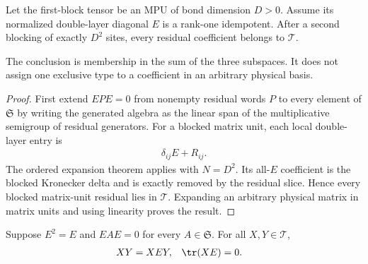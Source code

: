 \begin{lemma}
    \label{thm:mpu_second_block_residual_three_forms}
    \leanok
    Let the first-block tensor be an MPU of bond dimension $D>0$.  Assume its
    normalized double-layer diagonal $E$ is a rank-one idempotent.  After a
    second blocking of exactly $D^2$ sites, every residual coefficient belongs
    to $\mathcal T$.

    The conclusion is membership in the sum of the three subspaces.  It does
    not assign one exclusive type to a coefficient in an arbitrary physical
    basis.
\end{lemma}

\begin{proof}\leanok
    First extend $EPE=0$ from nonempty residual words $P$ to every element of
    $\mathfrak S$ by writing the generated algebra as the linear span of the
    multiplicative semigroup of residual generators.  For a blocked matrix
    unit, each local double-layer entry is
    \begin{align}
        \delta_{ij}E+R_{ij}.
    \end{align}
    The ordered expansion theorem applies with $N=D^2$.  Its all-$E$
    coefficient is the blocked Kronecker delta and is exactly removed by the
    residual slice.  Hence every blocked matrix-unit residual lies in
    $\mathcal T$.  Expanding an arbitrary physical matrix in matrix units and
    using linearity proves the result.
\end{proof}

\begin{lemma}
    \label{thm:mpu_three_form_contractions}
    \leanok
    Suppose $E^2=E$ and $EAE=0$ for every $A\in\mathfrak S$.  For all
    $X,Y\in\mathcal T$,
    \begin{align}
        XY & =XEY,
           & \tr(XE) & =0.
    \end{align}
\end{lemma}

